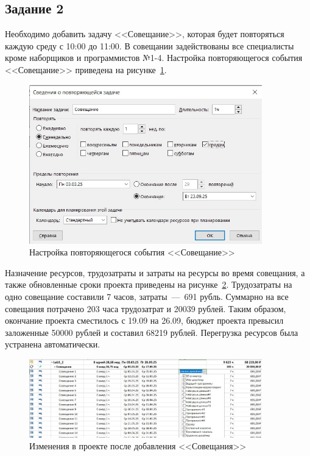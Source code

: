 \subsection{Задание 2}

Необходимо добавить задачу <<Совещание>>, которая будет повторяться каждую среду с 10:00 до 11:00.
В совещании задействованы все специалисты кроме наборщиков и программистов №1-4.
Настройка повторяющегося события <<Совещание>> приведена на рисунке~\ref{fig:screen2_1}.

\begin{figure}[H]
	\centering
	\includegraphics[width=0.9\textwidth]{img/lab3/task2/screen1.jpg}
	\caption{Настройка повторяющегося события <<Совещание>>}
	\label{fig:screen2_1}
\end{figure}

Назначение ресурсов, трудозатраты и затраты на ресурсы во время совещания, а также обновленные сроки проекта приведены на рисунке~\ref{fig:screen2_2}.
Трудозатраты на одно совещание составили 7 часов, затраты~---~691 рубль.
Суммарно на все совещания потрачено 203 часа трудозатрат и 20039 рублей.
Таким образом, окончание проекта сместилось с 19.09 на 26.09, бюджет проекта превысил заложенные 50000 рублей и составил 68219 рублей.
Перегрузка ресурсов была устранена автоматически.

\begin{figure}[H]
	\centering
	\includegraphics[width=0.9\textwidth]{img/lab3/task2/screen2.jpg}
	\caption{Изменения в проекте после добавления <<Совещания>>}
	\label{fig:screen2_2}
\end{figure}

